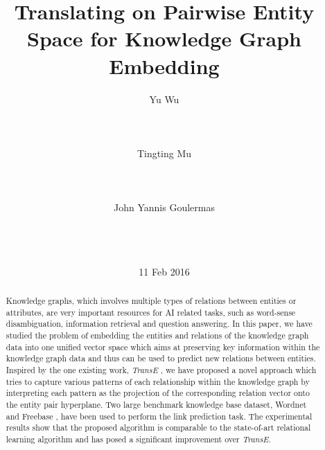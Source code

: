 \documentclass[9pt]{sig-alternate-05-2015}
\begin{document}

\title{Translating on Pairwise Entity Space for Knowledge Graph Embedding}

%
\author{
\alignauthor
Yu Wu \\
       \\
       \\
       \\
\alignauthor
Tingting Mu \\
       \\
        \\
       \\
 \alignauthor
John Yannis Goulermas \\
       \\
        \\
       \\
 }
\date{11 Feb 2016}
             
\maketitle

\begin{abstract}
Knowledge graphs, which involves multiple types of relations between entities or attributes, are very important resources for AI related tasks, such as  word-sense disambiguation, information retrieval and question answering. In this paper, we have studied the problem of embedding the entities and relations of the knowledge graph data into one unified vector space which aims at preserving key information within the knowledge graph data and thus can be used to predict new relations between  entities. Inspired by the one existing work, \emph{TransE} \cite{bordes_translating_2013}, we have proposed a novel approach which tries to capture various patterns of each relationship within the knowledge graph by interpreting each pattern as the projection  of the corresponding relation vector  onto the  entity pair hyperplane. Two large benchmark knowledge base dataset, Wordnet \cite{miller_wordnet:_1995} and Freebase \cite{bollacker_freebase:_2008}, have been used to perform the link prediction task. The experimental results show that the proposed algorithm is comparable to the state-of-art relational learning algorithm and has posed a significant improvement over  \emph{TransE}.
\end{abstract}
\end{document}
